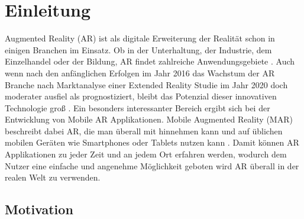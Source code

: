 \documentclass[12pt,a4paper, oneside]{scrartcl}
\begin{document}
\tableofcontents



\newpage


\section{Einleitung}

Augmented Reality (AR) ist als digitale Erweiterung der Realität schon in einigen Branchen im Einsatz. Ob in der Unterhaltung, der Industrie, dem Einzelhandel oder der Bildung, AR findet zahlreiche Anwendungsgebiete \cite{conrad}. 
Auch wenn nach den anfänglichen Erfolgen im Jahr 2016 das Wachstum der AR Branche nach Marktanalyse einer Extended Reality Studie im Jahr 2020 doch moderater ausfiel als prognostiziert, bleibt das Potenzial dieser innovativen Technologie groß \cite{marktanalyse_AR}.
Ein besonders interessanter Bereich ergibt sich bei der Entwicklung von Mobile AR Applikationen. Mobile Augmented Reality (MAR) beschreibt dabei AR, die man überall mit hinnehmen kann und auf üblichen mobilen Geräten wie Smartphones oder Tablets nutzen kann \cite{craig_2013}.
Damit können AR Applikationen zu jeder Zeit und an jedem Ort erfahren werden, wodurch dem Nutzer eine einfache und angenehme Möglichkeit geboten wird AR überall in der realen Welt zu verwenden.

	
	
\subsection{Motivation}
	
\end{document}
